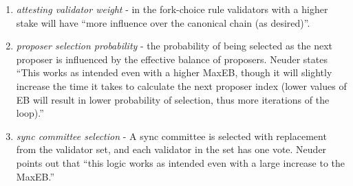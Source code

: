 \documentclass[UTF8]{article}
\begin{document}
\begin{enumerate}
\item \textit{attesting validator weight } - in the fork-choice rule validators with a higher stake will have ``more influence over the canonical chain (as desired)''. 
\item \textit{proposer selection probability} - the probability of being selected as the next proposer is influenced by the effective balance of proposers. 
%
%
%
Neuder states ``This works as intended even with a higher MaxEB, though it will slightly increase the time it takes to calculate the next proposer index (lower values of EB will result in lower probability of selection, thus more iterations of the loop).''

\item \textit{sync committee selection} - A sync committee is selected with replacement from the validator set, and each validator in the set has one vote. Neuder points out that ``this logic works as intended even with a large increase to the MaxEB.''
\end{enumerate}
\end{document}
